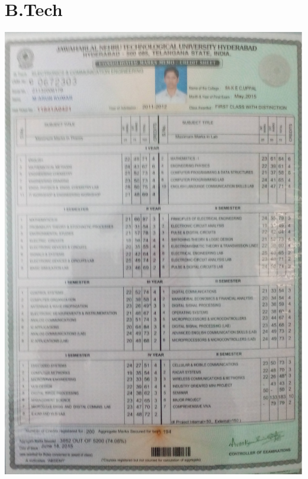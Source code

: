 \documentclass{article}
\begin{document}
\section{B.Tech}
	\includegraphics[scale=0.3]{proofs/b_tech.jpg}
\end{document}

